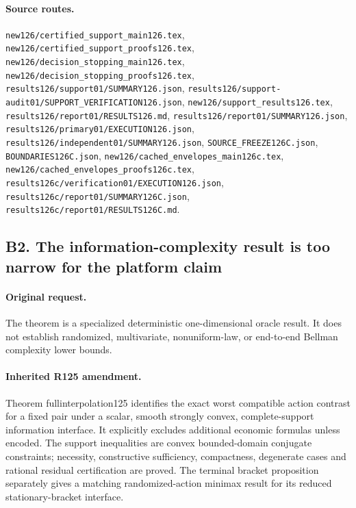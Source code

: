 \paragraph{Source routes.} \nolinkurl{new126/certified_support_main126.tex}, \nolinkurl{new126/certified_support_proofs126.tex}, \nolinkurl{new126/decision_stopping_main126.tex}, \nolinkurl{new126/decision_stopping_proofs126.tex}, \nolinkurl{results126/support01/SUMMARY126.json}, \nolinkurl{results126/support-audit01/SUPPORT_VERIFICATION126.json}, \nolinkurl{new126/support_results126.tex}, \nolinkurl{results126/report01/RESULTS126.md}, \nolinkurl{results126/report01/SUMMARY126.json}, \nolinkurl{results126/primary01/EXECUTION126.json}, \nolinkurl{results126/independent01/SUMMARY126.json}, \nolinkurl{SOURCE_FREEZE126C.json}, \nolinkurl{BOUNDARIES126C.json}, \nolinkurl{new126/cached_envelopes_main126c.tex}, \nolinkurl{new126/cached_envelopes_proofs126c.tex}, \nolinkurl{results126c/verification01/EXECUTION126.json}, \nolinkurl{results126c/report01/SUMMARY126C.json}, \nolinkurl{results126c/report01/RESULTS126C.md}.

\subsection*{B2. The information-complexity result is too narrow for the platform claim}
\paragraph{Original request.} The theorem is a specialized deterministic one-dimensional oracle result. It does not establish randomized, multivariate, nonuniform-law, or end-to-end Bellman complexity lower bounds.

\paragraph{Inherited R125 amendment.} Theorem fullinterpolation125 identifies the exact worst compatible action contrast for a fixed pair under a scalar, smooth strongly convex, complete-support information interface. It explicitly excludes additional economic formulas unless encoded. The support inequalities are convex bounded-domain conjugate constraints; necessity, constructive sufficiency, compactness, degenerate cases and rational residual certification are proved. The terminal bracket proposition separately gives a matching randomized-action minimax result for its reduced stationary-bracket interface.

